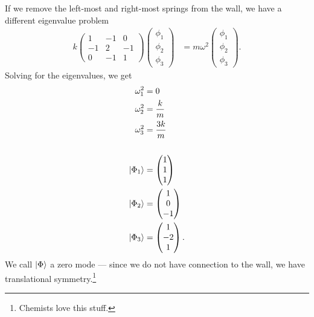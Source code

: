 \documentclass[10pt]{mypackage}
\begin{document}
\begin{example}
  If we remove the left-most and right-most springs from the wall, we have a different eigenvalue problem
  \begin{align*}
    k \begin{pmatrix}1 & -1 & 0 \\ -1 & 2 & -1 \\ 0 & -1 & 1 \end{pmatrix} \begin{pmatrix}\phi_1\\\phi_2\\\phi_3\end{pmatrix} &= m\omega^2 \begin{pmatrix}\phi_1\\\phi_2\\\phi_3\end{pmatrix}.
  \end{align*}
  Solving for the eigenvalues, we get
  \begin{align*}
    \omega_1^2 &= 0\\
    \omega_2^2 &= \frac{k}{m}\\
    \omega_3^2 &= \frac{3k}{m}\\
    \\
    \ket{\Phi_1} &= \begin{pmatrix}1\\1\\1\end{pmatrix}\\
    \ket{\Phi_2} &= \begin{pmatrix}1\\0\\-1\end{pmatrix}\\
    \ket{\Phi_3} &= \begin{pmatrix}1\\-2\\1\end{pmatrix}.
  \end{align*}
  We call $\ket{\Phi}$ a zero mode --- since we do not have connection to the wall, we have translational symmetry.\footnote{Chemists love this stuff.}
\end{example}
\end{document}
